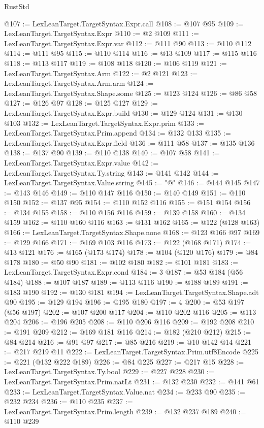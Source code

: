 \begin{lexlean}{RustStd}
\begin{coremodule}
{\begin{coremodule}
{{{{{{{{{{{{{{{{{{{{{{{{{{{{{{{{{{{{{{{{{{{{{{{@107 := LexLeanTarget.TargetSyntax.Expr.call
@108 := @107 @95
@109 := LexLeanTarget.TargetSyntax.Expr
@110 := @2 @109
@111 := LexLeanTarget.TargetSyntax.Expr.var
@112 := @111 @90
@113 := @110 @112
@114 := @111 @95
@115 := @110 @114
@116 := @13 @109
@117 := @115 @116
@118 := @113 @117
@119 := @108 @118
@120 := @106 @119
@121 := LexLeanTarget.TargetSyntax.Arm
@122 := @2 @121
@123 := LexLeanTarget.TargetSyntax.Arm.arm
@124 := LexLeanTarget.TargetSyntax.Shape.some
@125 := @123 @124
@126 := @86 @58
@127 := @126 @97
@128 := @125 @127
@129 := LexLeanTarget.TargetSyntax.Expr.build
@130 := @129 @124
@131 := @130 @103
@132 := LexLeanTarget.TargetSyntax.Expr.prim
@133 := LexLeanTarget.TargetSyntax.Prim.append
@134 := @132 @133
@135 := LexLeanTarget.TargetSyntax.Expr.field
@136 := @111 @58
@137 := @135 @136
@138 := @137 @90
@139 := @110 @138
@140 := @107 @58
@141 := LexLeanTarget.TargetSyntax.Expr.value
@142 := LexLeanTarget.TargetSyntax.Ty.string
@143 := @141 @142
@144 := LexLeanTarget.TargetSyntax.Value.string
@145 := "@"
@146 := @144 @145
@147 := @143 @146
@149 := @110 @147 @116
@150 := @140 @149
@151 := @110 @150
@152 := @137 @95
@154 := @110 @152 @116
@155 := @151 @154
@156 := @134 @155
@158 := @110 @156 @116
@159 := @139 @158
@160 := @134 @159
@162 := @110 @160 @116
@163 := @131 @162
@165 := @122 (@128 @163)
@166 := LexLeanTarget.TargetSyntax.Shape.none
@168 := @123 @166 @97
@169 := @129 @166
@171 := @169 @103 @116
@173 := @122 (@168 @171)
@174 := @13 @121
@176 := @165 (@173 @174)
@178 := @104 (@120 @176)
@179 := @84 @178
@180 := @50 @90
@181 := @102 @180
@182 := @101 @181
@183 := LexLeanTarget.TargetSyntax.Expr.cond
@184 := 3
@187 := @53 @184 (@56 @184)
@188 := @107 @187
@189 := @113 @116
@190 := @188 @189
@191 := @183 @190
@192 := @130 @181
@194 := LexLeanTarget.TargetSyntax.Shape.adt @90
@195 := @129 @194
@196 := @195 @180
@197 := 4
@200 := @53 @197 (@56 @197)
@202 := @107 @200 @117
@204 := @110 @202 @116
@205 := @113 @204
@206 := @196 @205
@208 := @110 @206 @116
@209 := @192 @208
@210 := @191 @209
@212 := @169 @181 @116
@214 := @182 (@210 @212)
@215 := @84 @214
@216 := @91 @97
@217 := @85 @216
@219 := @10 @142 @14
@221 := @217 @219 @11
@222 := LexLeanTarget.TargetSyntax.Prim.utf8Encode
@225 := @221 (@132 @222 @189)
@226 := @84 @225
@227 := @217 @15
@228 := LexLeanTarget.TargetSyntax.Ty.bool
@229 := @227 @228
@230 := LexLeanTarget.TargetSyntax.Prim.natLt
@231 := @132 @230
@232 := @141 @61
@233 := LexLeanTarget.TargetSyntax.Value.nat
@234 := @233 @90
@235 := @232 @234
@236 := @110 @235
@237 := LexLeanTarget.TargetSyntax.Prim.length
@239 := @132 @237 @189
@240 := @110 @239
}}}}}}}}}}}}}}}}}}}}}}}}}}}}}}}}}}}}}}}}}}}}}}}
\end{coremodule}}
\end{coremodule}
\end{lexlean}
